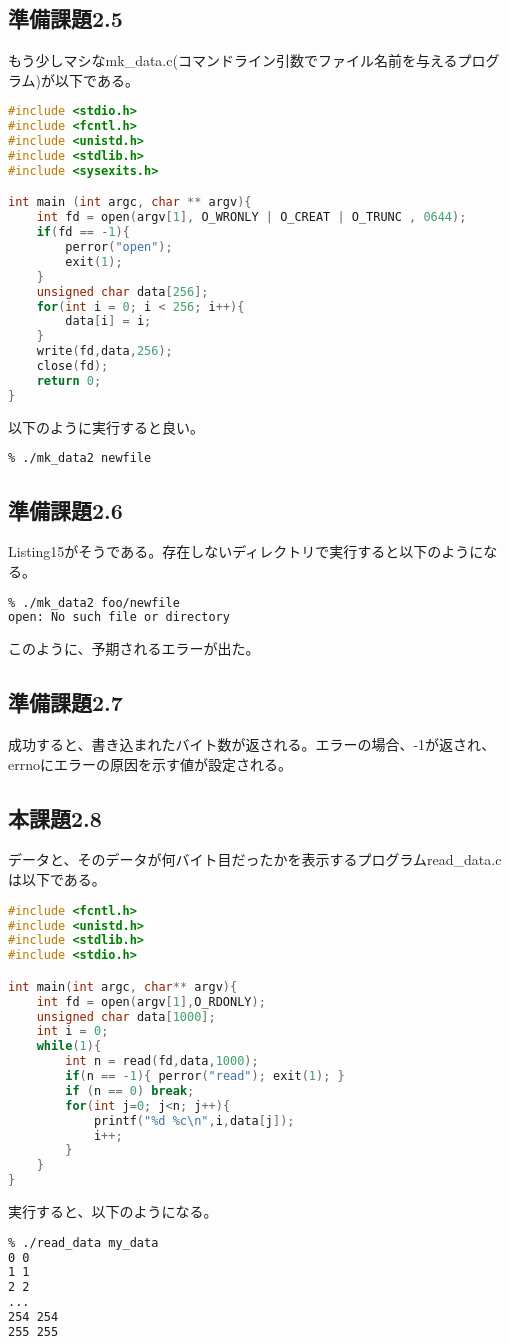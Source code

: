 \documentclass{ltjsarticle}
\begin{document}
\subsection{準備課題2.5}
もう少しマシなmk\_data.c(コマンドライン引数でファイル名前を与えるプログラム)が以下である。
\begin{lstlisting}[caption=mk\_data2.c,language=C]
#include <stdio.h>
#include <fcntl.h>
#include <unistd.h>
#include <stdlib.h>
#include <sysexits.h>

int main (int argc, char ** argv){
    int fd = open(argv[1], O_WRONLY | O_CREAT | O_TRUNC , 0644);
    if(fd == -1){
        perror("open");
        exit(1);
    }
    unsigned char data[256];
    for(int i = 0; i < 256; i++){
        data[i] = i;
    }
    write(fd,data,256);
    close(fd);
    return 0;
}
\end{lstlisting}
以下のように実行すると良い。
\begin{lstlisting}[caption=mk\_data2.c 実効,language=bash]
% gcc mk_data2.c -o mk_data2
% ./mk_data2 newfile
\end{lstlisting}

\subsection{準備課題2.6}
Listing15がそうである。存在しないディレクトリで実行すると以下のようになる。
\begin{lstlisting}[caption=mk\_data2 存在しないディレクトリで実効,language=bash]
% gcc mk_data2.c -o mk_data2
% ./mk_data2 foo/newfile
open: No such file or directory
\end{lstlisting}
このように、予期されるエラーが出た。

\subsection{準備課題2.7}
成功すると、書き込まれたバイト数が返される。エラーの場合、-1が返され、errnoにエラーの原因を示す値が設定される。

\subsection{本課題2.8}
データと、そのデータが何バイト目だったかを表示するプログラムread\_data.cは以下である。
\begin{lstlisting}[caption=read\_data.c,language=C]
#include <fcntl.h>
#include <unistd.h>
#include <stdlib.h>
#include <stdio.h>

int main(int argc, char** argv){
    int fd = open(argv[1],O_RDONLY);
    unsigned char data[1000];
    int i = 0;
    while(1){
        int n = read(fd,data,1000);
        if(n == -1){ perror("read"); exit(1); }
        if (n == 0) break;
        for(int j=0; j<n; j++){
            printf("%d %c\n",i,data[j]);
            i++;
        }
    }
}
\end{lstlisting}
実行すると、以下のようになる。
\begin{lstlisting}[caption=read\_data.c 実行,language=bash]
% gcc read_data.c -o read_data
% ./read_data my_data
0 0
1 1
2 2
...
254 254
255 255
\end{lstlisting}
\end{document}
